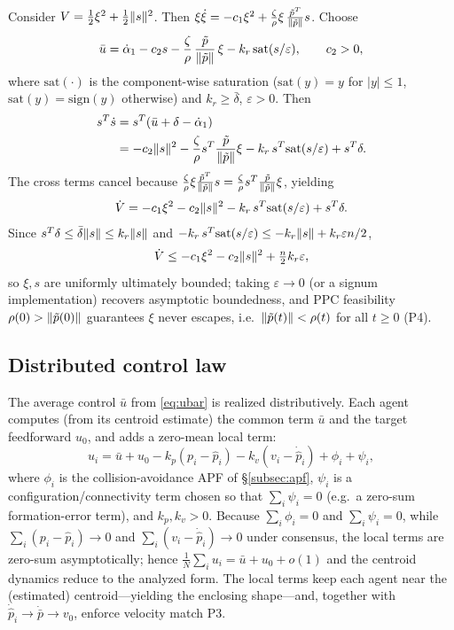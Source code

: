Consider $V=\frac12\xi^2+\frac12\lVert s \rVert^2$. Then
$\xi\dot\xi = -c_1\xi^2 + \frac{\zeta}{\rho}\xi\,
\frac{\tilde p^T}{\lVert \tilde p \rVert}s$. Choose
\begin{equation}
\bar u = \dot\alpha_1 - c_2 s
       - \frac{\zeta}{\rho}\,\frac{\tilde p}{\lVert \tilde p \rVert}\,\xi
       - k_r\,\mathrm{sat}(s/\varepsilon),
\qquad c_2>0,
\label{eq:ubar}
\end{equation}
where $\mathrm{sat}(\cdot)$ is the component-wise saturation
($\mathrm{sat}(y)=y$ for $|y|\le1$, $\mathrm{sat}(y)=\mathrm{sign}(y)$
otherwise) and $k_r\ge\bar\delta$, $\varepsilon>0$. Then
\[
\begin{aligned}
s^T\dot s
&= s^T(\bar u + \delta - \dot\alpha_1)\\
&= -c_2\lVert s \rVert^2
   - \frac{\zeta}{\rho}s^T\frac{\tilde p}{\lVert \tilde p \rVert}\xi
   - k_r\,s^T\mathrm{sat}(s/\varepsilon) + s^T\delta .
\end{aligned}
\]
The cross terms cancel because
$\frac{\zeta}{\rho}\xi\frac{\tilde p^T}{\lVert \tilde p \rVert}s
 = \frac{\zeta}{\rho}s^T\frac{\tilde p}{\lVert \tilde p \rVert}\xi$, yielding
\[
\dot V = -c_1\xi^2 - c_2\lVert s \rVert^2
        - k_r\,s^T\mathrm{sat}(s/\varepsilon) + s^T\delta.
\]
Since $s^T\delta\le\bar\delta\lVert s \rVert\le k_r\lVert s \rVert$ and
$-k_r\,s^T\mathrm{sat}(s/\varepsilon)\le -k_r\lVert s \rVert+k_r\varepsilon n/2$,
\begin{equation}
\dot V \le -c_1\xi^2 - c_2\lVert s \rVert^2 + \tfrac{n}{2}k_r\varepsilon,
\label{eq:Vdot}
\end{equation}
so $\xi,s$ are uniformly ultimately bounded; taking $\varepsilon\to0$ (or a
signum implementation) recovers asymptotic boundedness, and PPC feasibility
$\rho(0)>\lVert \tilde p(0) \rVert$ guarantees $\xi$ never escapes, i.e.\
$\lVert \tilde p(t) \rVert < \rho(t)$ for all $t\ge0$ (P4).

\subsection{Distributed control law}
\label{subsec:distributed}

The average control $\bar u$ from \eqref{eq:ubar} is realized distributively.
Each agent computes (from its centroid estimate) the common term $\bar u$
and the target feedforward $u_0$, and adds a zero-mean local term:
\begin{equation}
u_i = \bar u + u_0
      - k_p(p_i - \hat p_i) - k_v(v_i - \dot{\hat p}_i)
      + \phi_i + \psi_i,
\label{eq:ui}
\end{equation}
where $\phi_i$ is the collision-avoidance APF of \S\ref{subsec:apf},
$\psi_i$ is a configuration/connectivity term chosen so that
$\sum_i\psi_i=0$ (e.g.\ a zero-sum formation-error term), and
$k_p,k_v>0$. Because $\sum_i\phi_i=0$ and $\sum_i\psi_i=0$, while
$\sum_i(p_i-\hat p_i)\to0$ and $\sum_i(v_i-\dot{\hat p}_i)\to0$ under
consensus, the local terms are zero-sum asymptotically; hence
$\frac1N\sum_i u_i = \bar u + u_0 + o(1)$ and the centroid dynamics reduce
to the analyzed form. The local terms keep each agent near the (estimated)
centroid---yielding the enclosing shape---and, together with
$\dot{\hat p}_i\to\dot{\bar p}\to v_0$, enforce velocity match P3.

